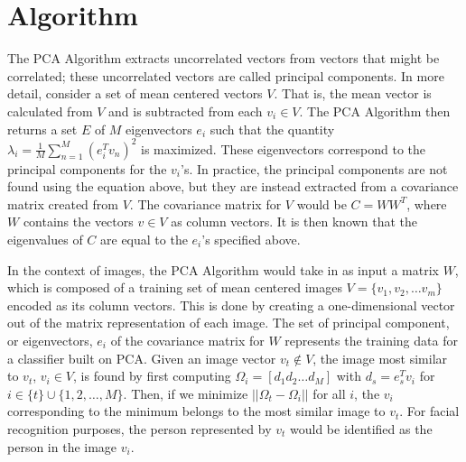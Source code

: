 \documentclass[letterpaper]{article}
\begin{document}
\section{Algorithm}
The PCA Algorithm extracts uncorrelated vectors from vectors
that might be correlated; these uncorrelated vectors are called
principal components. In more detail, consider a set of mean centered
vectors $V$. That is, the mean vector is calculated from $V$ and is subtracted from each $v_i \in V$. The PCA Algorithm then returns
a set $E$ of $M$ eigenvectors $e_i$ such that the quantity
\begin{math}
  \lambda_i = \frac{1}{M} \sum_{n=1}^{M}(e_{i}^{T} v_n)^2
\end{math}
is maximized. These eigenvectors correspond to the principal
components for the $v_i$'s.  In practice, the principal components are
not found using the equation above, but they are instead extracted
from a covariance matrix created from $V$.  The covariance matrix for
$V$ would be $C=WW^T$, where $W$ contains the vectors $v \in V$ as
column vectors. It is then known that the eigenvalues of $C$ are equal to
the $e_i$'s specified above.

In the context of images, the PCA Algorithm would take in as input a
matrix $W$, which is composed of a training set of mean centered images $V = \{v_1, v_2, \ldots
v_m\}$ encoded as
its column vectors.  This is done by creating a one-dimensional vector
out of the matrix representation of each image. The set of principal
component, or eigenvectors, $e_i$ of the covariance matrix for $W$
represents the training data for a classifier built on PCA.  Given an
image vector $v_t \notin V$, the image most similar to $v_t$, $v_i \in V$, is found by first
computing
\begin{math}
  \Omega_i = \left[ d_1 d_2 \ldots d_M \right]
\end{math} 
with $d_s = e_s^T v_i$ for $i \in \{t\} \cup \{1, 2, \ldots, M \}$. Then, if we minimize
\begin{math}
\left| \left| \Omega_t - \Omega_i \right| \right|
\end{math}
for all $i$, the $v_i$ corresponding to the minimum belongs to the
most similar image to $v_t$. For facial recognition purposes, the 
person represented by $v_t$ would be identified as the person in the
image $v_i$.
\end{document}
